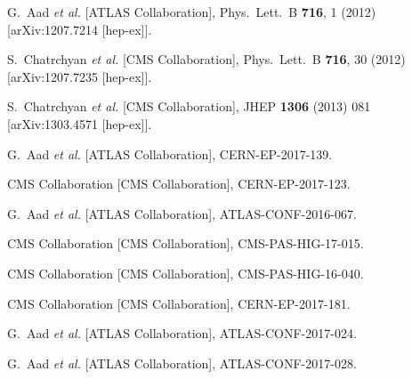 \documentclass[10pt]{article}
\begin{document}
\begin{thebibliography}{99}



  G.~Aad {\it et al.}  [ATLAS Collaboration],
  Phys.\ Lett.\ B {\bf 716}, 1 (2012)
  [arXiv:1207.7214 [hep-ex]].
  
  
  S.~Chatrchyan {\it et al.}  [CMS Collaboration],
  Phys.\ Lett.\ B {\bf 716}, 30 (2012)
  [arXiv:1207.7235 [hep-ex]].


  S.~Chatrchyan {\it et al.} [CMS Collaboration],
  JHEP {\bf 1306} (2013) 081
  [arXiv:1303.4571 [hep-ex]].


  G.~Aad {\it et al.}  [ATLAS Collaboration],
  CERN-EP-2017-139.


  CMS Collaboration [CMS Collaboration],
  CERN-EP-2017-123.


  G.~Aad {\it et al.}  [ATLAS Collaboration],
  ATLAS-CONF-2016-067.


  CMS Collaboration  [CMS Collaboration],
  CMS-PAS-HIG-17-015.


  CMS Collaboration  [CMS Collaboration],
  CMS-PAS-HIG-16-040.


  CMS Collaboration [CMS Collaboration],
  CERN-EP-2017-181.


  G.~Aad {\it et al.}  [ATLAS Collaboration],
  ATLAS-CONF-2017-024.


  G.~Aad {\it et al.}  [ATLAS Collaboration],
  ATLAS-CONF-2017-028.


\end{thebibliography}

 
\end{document}
